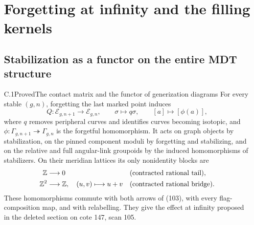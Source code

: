 \section{Forgetting at infinity and the filling kernels}

\subsection{Stabilization as a functor on the entire MDT structure}

\begin{result}{C.1}{Proved}{The contact matrix and the functor of generization diagrams}
For every stable $(g,n)$, forgetting the last marked point induces
\[
 Q:\mathcal E_{g,n+1}\longrightarrow\mathcal E_{g,n},
 \qquad \sigma\longmapsto q\sigma,\qquad[a]\longmapsto[\phi(a)],
\]
where $q$ removes peripheral curves and identifies curves becoming isotopic, and $\phi:\Gamma_{g,n+1}\twoheadrightarrow\Gamma_{g,n}$ is the forgetful homomorphism. It acts on graph objects by stabilization, on the pinned component moduli by forgetting and stabilizing, and on the relative and full angular-link groupoids by the induced homomorphisms of stabilizers. On their meridian lattices its only nonidentity blocks are
\[
 \begin{aligned}
 \mathbb Z&\longrightarrow0&&\text{(contracted rational tail)},\\
 \mathbb Z^2&\longrightarrow\mathbb Z,\quad(u,v)\longmapsto u+v
 &&\text{(contracted rational bridge)}.
 \end{aligned}
\]
These homomorphisms commute with both arrows of (103), with every flag-composition map, and with relabelling. They give the effect at infinity proposed in the deleted section on cote 147, scan 105.
\end{result}

